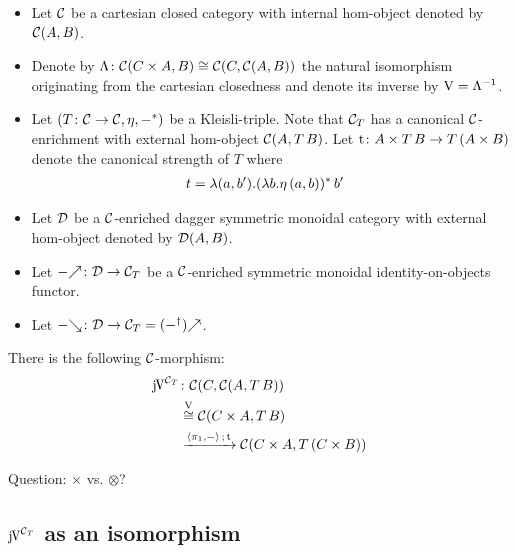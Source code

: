 \documentclass[runningheads,envcountsame]{llncs}
\begin{document}
\begin{itemize}
    \item Let $\mathcal{C}$ be a cartesian closed category with internal hom-object denoted by $\mathcal{C}(A, B)$.
    \item Denote by $\curry\colon \homC{C \times A}{B} \cong \homC{C}{\homC{A}{B}}$ the natural isomorphism originating from the cartesian closedness and denote its inverse by $\uncurry = \curry^{-1}$.
    \item Let $(T\colon \C \to \C, \munit, -^*)$ be a Kleisli-triple. Note that $\mathcal{C}_T$ has a canonical $\mathcal{C}$-enrichment with external hom-object $\mathcal{C}(A, T\,B)$. Let $\mathrm{t}\colon A \times T\,B \to T\,(A \times B)$ denote the canonical strength of $T$ where 
    \begin{align}
        t &= \lambda (a, b'). (\lambda b. \munit\,(a, b))^*\,b'
    \end{align}
    \item Let $\mathcal{D}$ be a $\mathcal{C}$-enriched dagger symmetric monoidal category with external hom-object denoted by $\mathcal{D}(A, B)$.
    \item Let $\f{-}\colon \D \to \C_T$ be a $\mathcal{C}$-enriched symmetric monoidal identity-on-objects functor.
    \item Let $\b{-}\colon \D \to \C_T = \f{(\rev{-})}$.
\end{itemize}

There is the following $\mathcal{C}$-morphism: 
\begin{align}
    \juncurry[\C_T] &\colon \homC{C}{\homC{A}{T\,B}} \\
                    &\overset{\uncurry}{\cong} \homC{C \times A}{T\,B} \\
                    &\xrightarrow{\comp{\langle \pi_1, - \rangle}{\mstrength}} \homC{C \times A}{T\,(C \times B)}
\end{align}

Question: $\times$ vs. $\otimes$?

\subsection{$\juncurry[\C_T]$ as an isomorphism}
\end{document}
